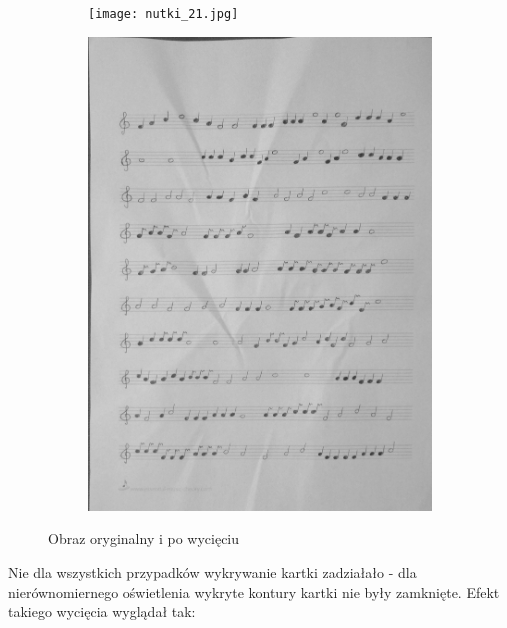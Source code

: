 \documentclass[11pt]{article}
\begin{document}
\begin{figure}
    \centering
    \begin{subfigure}{.5\textwidth}
        \centering
        \graphicspath{ {Resources/} }
        \texttt{[image: nutki\_21.jpg]}
        \label{fig:sub1}
    \end{subfigure}%
    \begin{subfigure}{.5\textwidth}
        \centering
        \graphicspath{ {output/} }
        \includegraphics[width=.9\linewidth]{warped21_gray.jpg}
        \label{fig:sub2}
    \end{subfigure}
    \caption{Obraz oryginalny i po wycięciu}
    \label{fig:test}
\end{figure}


\pagebreak

\begin{flushleft}
Nie dla wszystkich przypadków wykrywanie kartki zadziałało - dla nierównomiernego oświetlenia wykryte kontury kartki nie były zamknięte. 
Efekt takiego wycięcia wyglądał tak:
\end{flushleft}
\end{document}
